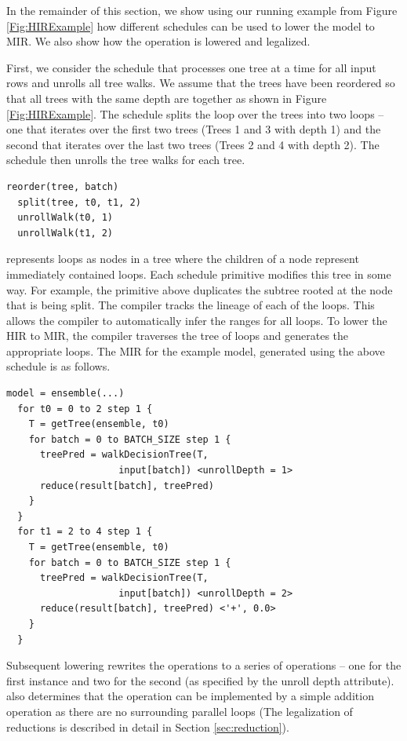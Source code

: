 In the remainder of this section, we show using our running example
from Figure \ref{Fig:HIRExample} how different schedules can be used to 
lower the model to MIR. We also show how the  operation
is lowered and legalized.

First, we consider the schedule that processes one tree at a time 
for all input rows and unrolls all tree walks. 
We assume that the trees have been reordered so that all trees with 
the same depth are together as shown in Figure \ref{Fig:HIRExample}.
The schedule splits the loop over the trees into two loops -- one that
iterates over the first two trees (Trees 1 and 3 with depth 1) and 
the second that iterates over the last two trees (Trees 2 and 4 with
depth 2). The schedule then unrolls the tree walks for each tree.
\begin{lstlisting}[style=c++]
  reorder(tree, batch)  
  split(tree, t0, t1, 2)
  unrollWalk(t0, 1)
  unrollWalk(t1, 2)
\end{lstlisting}

\Treebeard{} represents loops as nodes in a tree where the children
of a node represent immediately contained loops. Each schedule 
primitive modifies this tree in some way. For example, the 
primitive above duplicates the subtree rooted at the node that is 
being split. The compiler tracks the lineage of each of the loops. This allows 
the compiler to automatically infer the ranges for all loops. To lower the
HIR to MIR, the compiler traverses the tree of loops and generates the
appropriate loops. The MIR for the example model, generated using the above   
schedule is as follows. 
\begin{lstlisting}[style=c++]
  model = ensemble(...)
  for t0 = 0 to 2 step 1 {
    T = getTree(ensemble, t0)
    for batch = 0 to BATCH_SIZE step 1 {
      treePred = walkDecisionTree(T, 
                    input[batch]) <unrollDepth = 1>
      reduce(result[batch], treePred)
    }
  }
  for t1 = 2 to 4 step 1 {
    T = getTree(ensemble, t0)
    for batch = 0 to BATCH_SIZE step 1 {
      treePred = walkDecisionTree(T,
                    input[batch]) <unrollDepth = 2>
      reduce(result[batch], treePred) <'+', 0.0>
    }
  }
\end{lstlisting}
Subsequent lowering rewrites the  operations to a 
series of  operations -- one for the 
first instance and two for the second (as specified by the unroll depth
attribute). \Treebeard{} also determines that the  operation
can be implemented by a simple addition operation as there are no 
surrounding parallel loops (The legalization of reductions is described 
in detail in Section \ref{sec:reduction}).

